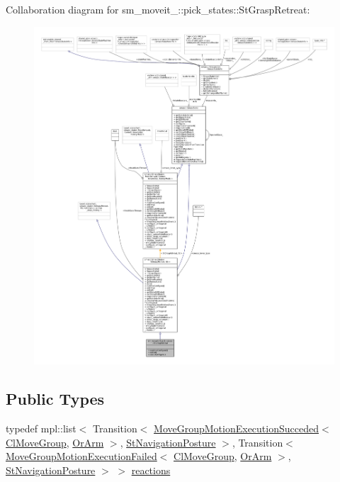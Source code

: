 Collaboration diagram for sm\+\_\+moveit\+\_\+:\+:pick\+\_\+states\+:\+:St\+Grasp\+Retreat\+:
\nopagebreak
\begin{figure}[H]
\begin{center}
\leavevmode
\includegraphics[width=350pt]{structsm__moveit__4_1_1pick__states_1_1StGraspRetreat__coll__graph}
\end{center}
\end{figure}
\subsection*{Public Types}
\begin{DoxyCompactItemize}
\item 
typedef mpl\+::list$<$ Transition$<$ \hyperlink{structmoveit__z__client_1_1MoveGroupMotionExecutionSucceded}{Move\+Group\+Motion\+Execution\+Succeded}$<$ \hyperlink{classmoveit__z__client_1_1ClMoveGroup}{Cl\+Move\+Group}, \hyperlink{classsm__moveit__4_1_1OrArm}{Or\+Arm} $>$, \hyperlink{structsm__moveit__4_1_1pick__states_1_1StNavigationPosture}{St\+Navigation\+Posture} $>$, Transition$<$ \hyperlink{structmoveit__z__client_1_1MoveGroupMotionExecutionFailed}{Move\+Group\+Motion\+Execution\+Failed}$<$ \hyperlink{classmoveit__z__client_1_1ClMoveGroup}{Cl\+Move\+Group}, \hyperlink{classsm__moveit__4_1_1OrArm}{Or\+Arm} $>$, \hyperlink{structsm__moveit__4_1_1pick__states_1_1StNavigationPosture}{St\+Navigation\+Posture} $>$ $>$ \hyperlink{structsm__moveit__4_1_1pick__states_1_1StGraspRetreat_aad4cc2d348387279c746f628b8f6da38}{reactions}
\end{DoxyCompactItemize}
